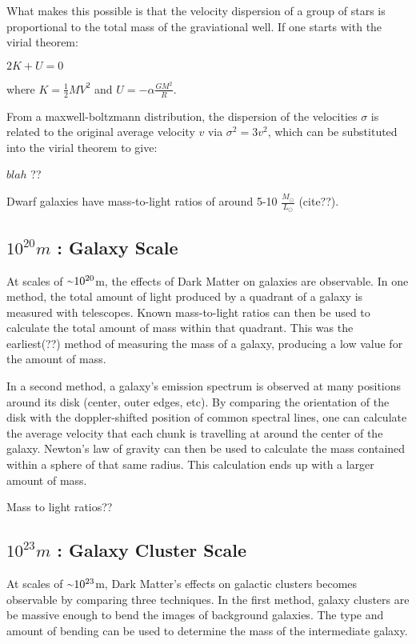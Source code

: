 What makes this possible is that the velocity dispersion of a group of stars is proportional to the total mass of the graviational well.
If one starts with the virial theorem:

$2K + U = 0$

where
$K=\frac{1}{2}MV^{2}$ and $U=-\alpha \frac{GM^2}{R}$.

From a maxwell-boltzmann distribution, the dispersion of the velocities $\sigma$ is related to the original average velocity $v$ via $\sigma^2 = 3v^2$, which can be substituted into the virial theorem to give:

$blah$
??

Dwarf galaxies have mass-to-light ratios of around 5-10 $\frac{M_\odot}{L_\odot}$ (cite??).



\subsection{$10^{20}m$ : Galaxy Scale}
%
At scales of $\nicetilde 10^{20}$m, the effects of Dark Matter on galaxies are observable.
In one method, the total amount of light produced by a quadrant of a galaxy is measured with telescopes.
Known mass-to-light ratios can then be used to calculate the total amount of mass within that quadrant.
This was the earliest(??) method of measuring the mass of a galaxy, producing a low value for the amount of mass.

In a second method, a galaxy's emission spectrum is observed at many positions around its disk (center, outer edges, etc).
By comparing the orientation of the disk with the doppler-shifted position of common spectral lines, one can calculate the average velocity that each chunk is travelling at around the center of the galaxy.
Newton's law of gravity can then be used to calculate the mass contained within a sphere of that same radius.
This calculation ends up with a larger amount of mass.

Mass to light ratios??

\subsection{$10^{23}m$ : Galaxy Cluster Scale}
%
At scales of $\nicetilde 10^{23}$m, Dark Matter's effects on galactic clusters becomes observable by comparing three techniques.
In the first method, galaxy clusters are be massive enough to bend the images of background galaxies.
The type and amount of bending can be used to determine the mass of the intermediate galaxy.

